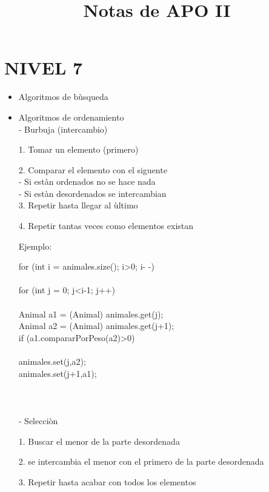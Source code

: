 \documentclass[12pt]{article}
\title{Notas de APO II}
\begin{document}
 \maketitle
\section*{NIVEL 7}
\begin{itemize}
 \item Algoritmos de bùsqueda\\
 \item Algoritmos de ordenamiento\\
 
 - Burbuja (intercambio)
   
   1. Tomar un elemento (primero)
   
   2. Comparar el elemento con el siguente\\
     - Si estàn ordenados no se hace nada\\
     - Si estàn desordenados se intercambian\\

   3. Repetir hasta llegar al ùltimo

   4. Repetir tantas veces como elementos existan

   

   Ejemplo:
  
   for (int i = animales.size(); i>0; i- -)\\
   {\\
    for (int j = 0; j<i-1; j++)\\
    {\\
     Animal a1 = (Animal) animales.get(j);\\
     Animal a2 = (Animal) animales.get(j+1);\\
     
     if (a1.compararPorPeso(a2)>0)\\
     {\\
      animales.set(j,a2);\\
      animales.set(j+1,a1);\\
     }\\
    }\\
   }\\


  - Selecciòn

    1. Buscar el menor de la parte desordenada

    2. se intercambia el menor con el primero de la parte desordenada

    3. Repetir hasta acabar con todos los elementos




\end{itemize}
\end{document}
